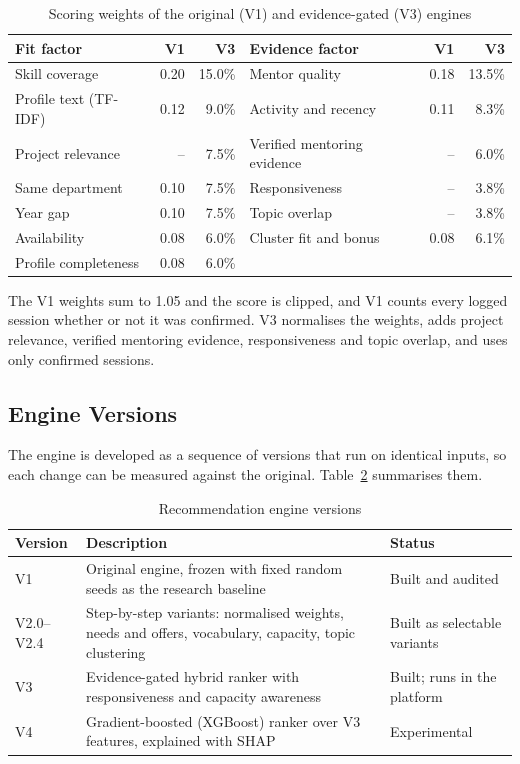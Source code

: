 \documentclass[12pt,a4paper]{report}
\begin{document}
\begin{table}[h]
\centering
\caption{Scoring weights of the original (V1) and evidence-gated (V3) engines}
\label{tab:weights}
\small
\begin{tabular}{lrr@{\hspace{1.2cm}}lrr}
\toprule
\textbf{Fit factor} & \textbf{V1} & \textbf{V3} & \textbf{Evidence factor} & \textbf{V1} & \textbf{V3}\\
\midrule
Skill coverage & 0.20 & 15.0\% & Mentor quality & 0.18 & 13.5\%\\
Profile text (TF-IDF) & 0.12 & 9.0\% & Activity and recency & 0.11 & 8.3\%\\
Project relevance & -- & 7.5\% & Verified mentoring evidence & -- & 6.0\%\\
Same department & 0.10 & 7.5\% & Responsiveness & -- & 3.8\%\\
Year gap & 0.10 & 7.5\% & Topic overlap & -- & 3.8\%\\
Availability & 0.08 & 6.0\% & Cluster fit and bonus & 0.08 & 6.1\%\\
Profile completeness & 0.08 & 6.0\% & & & \\
\bottomrule
\end{tabular}
\end{table}

The V1 weights sum to 1.05 and the score is clipped, and V1 counts every logged session whether or not it was confirmed. V3 normalises the weights, adds project relevance, verified mentoring evidence, responsiveness and topic overlap, and uses only confirmed sessions.

\subsection{Engine Versions}
The engine is developed as a sequence of versions that run on identical inputs, so each change can be measured against the original. Table~\ref{tab:versions} summarises them.

\begin{table}[h]
\centering
\caption{Recommendation engine versions}
\label{tab:versions}
\small
\begin{tabularx}{\textwidth}{>{\raggedright\arraybackslash}p{1.8cm}X>{\raggedright\arraybackslash}p{3.6cm}}
\toprule
\textbf{Version} & \textbf{Description} & \textbf{Status}\\
\midrule
V1 & Original engine, frozen with fixed random seeds as the research baseline & Built and audited\\
V2.0--V2.4 & Step-by-step variants: normalised weights, needs and offers, vocabulary, capacity, topic clustering & Built as selectable variants\\
V3 & Evidence-gated hybrid ranker with responsiveness and capacity awareness & Built; runs in the platform\\
V4 & Gradient-boosted (XGBoost) ranker over V3 features, explained with SHAP & Experimental\\
\bottomrule
\end{tabularx}
\end{table}
\end{document}
